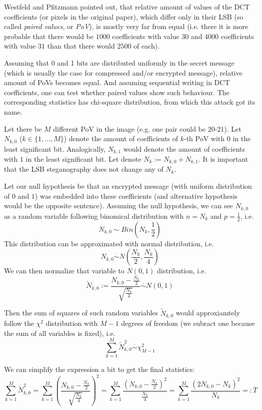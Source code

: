Westfeld and Pfitzmann pointed out, that relative amount of values of the DCT coefficients (or pixels in the original paper), 
which differ only in their LSB (so called \textit{paired values}, or \textit{PoV}), is mostly very far from equal 
(i.e. there it is more probable that there would be $1000$ coefficients with value $30$ and $4000$ coefficients with value $31$
than that there would $2500$ of each).

Assuming that 0 and 1 bits are distributed uniformly in the secret message 
(which is usually the case for compressed and/or encrypted message), relative
amount of PoVs becomes equal. And assuming sequential writing in DCT coefficients, one can test
whether paired values show such behaviour. The corresponding statistics has chi-square
distribution, from which this attack got its name.

Let there be $M$ different PoV in the image (e.g. one pair could be $20$-$21$). Let $N_{k, 0}$ ($k \in \{ 1, \ldots, M\}$)
denote the amount of coefficients of $k$-th PoV with $0$ in the least significant bit. Analogically,
$N_{k, 1}$ would denote the amount of coefficients with $1$ in the least significant bit. 
Let denote $N_k := N_{k, 0} + N_{k, 1}$. It is important that the LSB steganography does not change
any of $N_k$.
 
Let our null hypothesis be that an encrypted message (with uniform distribution of $0$ and $1$) 
was embedded into these coefficients (and alternative 
hypothesis would be the opposite sentence). Assuming the null hypothesis, we can see $N_{k, 0}$ as a random
variable following binomical distribution with $n = N_k$ and $p = \frac{1}{2}$, i.e.
$$N_{k, 0} \sim Bin\left(N_k, \frac{1}{2}\right)$$
This distribution can be approximated with normal distribution, i.e.
$$N_{k, 0} \overset{\cdot}{\sim} N\left(\frac{N_k}{2}, \frac{N_k}{4}\right)$$
We can then normalize that variable to $N(0, 1)$ distribution, i.e.
$$ \tilde{N}_{k, 0} := \frac{N_{k, 0} - \frac{N_k}{2}}{\sqrt{\frac{N_k}{4}}}  \overset{\cdot}{\sim} N( 0, 1)$$

Then the sum of squares of such random variables $\tilde{N}_{k, 0}$ would approxiamtely follow the $\chi^2$ distribution with $M-1$
degrees of freedom (we subract one because the sum of all variables is fixed), i.e.
$$\sum_{k = 1}^{M} \tilde{N}^{2}_{k, 0} \overset{\cdot}{\sim} \chi^2_{M-1}$$

We can simplify the expression a bit to get the final statistics: 
$$\sum_{k = 1}^{M} \tilde{N}^{2}_{k, 0} = 
\sum_{k = 1}^{M} \left(  \frac{N_{k, 0} - \frac{N_k}{2}}{\sqrt{\frac{N_k}{4}}}  \right)^2 =
\sum_{k = 1}^{M} \frac{\left(N_{k, 0} - \frac{N_k}{2}\right)^2}{\frac{N_k}{4}} = 
\sum_{k = 1}^{M} \frac{\left(2 N_{k, 0} - N_k\right)^2}{N_k}
=: T
$$ 

